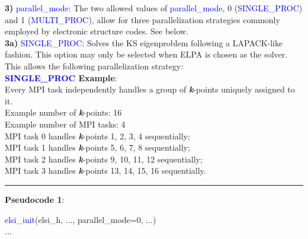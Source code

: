 \documentclass{report}
\begin{document}
\textbf{3)} \textcolor{blue}{parallel\_mode}:  The two allowed values of \textcolor{blue}{parallel\_mode}, 0 (\textcolor{blue}{SINGLE\_PROC}) and 1 (\textcolor{blue}{MULTI\_PROC}), allow for three parallelization strategies commonly employed by electronic structure codes.  See below.\\

\textbf{3a)} \textcolor{blue}{SINGLE\_PROC}:  Solves the KS eigenproblem following a LAPACK-like fashion.  This option may only be selected when ELPA is chosen as the solver.  This allows the following parallelization strategy:\\

\textbf{\textcolor{blue}{SINGLE\_PROC} Example}:\\

Every MPI task independently handles a group of \textbf{\textit{k}}-points uniquely assigned to it.\\

Example number of \textbf{\textit{k}}-points:  16\\
Example number of MPI tasks:  4\\

MPI task 0 handles \textbf{\textit{k}}-points  1,  2,  3,  4 sequentially;\\
MPI task 1 handles \textbf{\textit{k}}-points  5,  6,  7,  8 sequentially;\\
MPI task 2 handles \textbf{\textit{k}}-points  9, 10, 11, 12 sequentially;\\
MPI task 3 handles \textbf{\textit{k}}-points 13, 14, 15, 16 sequentially.\\

\noindent\rule{18cm}{0.4pt}

\textbf{Pseudocode 1}:\\

\begin{algorithm}[H]
\textcolor{blue}{elsi\_init}(elsi\_h, ..., parallel\_mode=0, ...)\\
...
\hspace{0.3cm}\\
\end{algorithm}
\end{document}
